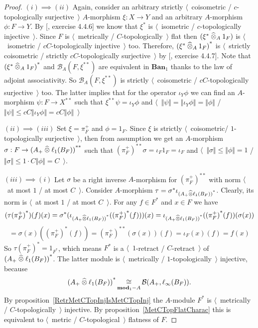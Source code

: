 \begin{proof} $(i)\implies (ii)$ Again, consider an arbitrary strictly 
$\langle$~coisometric / $c$-topologically surjective~$\rangle$ $A$-morphism
$\xi:X\to Y$ and an arbitrary $A$-morphism $\phi:F\to Y$. By
[\cite{HelLectAndExOnFuncAn}, exercise 4.4.6] we know that $\xi^*$ is
$\langle$~isometric / $c$-topologically injective~$\rangle$. Since $F$ is
$\langle$~metrically / $C$-topologically~$\rangle$ flat then
$(\xi^*\mathbin{\widehat{\otimes}}_{A}1_F)$ is $\langle$~isometric / $cC$-topologically
injective~$\rangle$ too. Therefore, ${(\xi^*\mathbin{\widehat{\otimes}}_{A}1_F)}^*$ is
$\langle$~strictly coisometric / strictly $cC$-topologically
surjective~$\rangle$ by [\cite{HelLectAndExOnFuncAn}, exercise 4.4.7]. Note that
${(\xi^*\mathbin{\widehat{\otimes}}_{A}1_F)}^*$ and $\mathcal{B}_A(F,\xi^{**})$ are equivalent
in $\mathbf{Ban}_1$ thanks to the law of adjoint associativity. So
$\mathcal{B}_A(F,\xi^{**})$ is strictly $\langle$~coisometric / 
$cC$-topologically surjective~$\rangle$ too. The latter implies that for the
operator $\iota_Y\phi$ we can find an $A$-morphism $\psi:F\to X^{**}$ such that
$\xi^{**}\psi=\iota_Y\phi$ and
$\langle$~$\Vert\psi\Vert=\Vert\iota_Y\phi\Vert=\Vert\phi\Vert$ /
$\Vert\psi\Vert\leq cC\Vert\iota_Y\phi\Vert=cC\Vert\phi\Vert$~$\rangle$

$(ii)\implies (iii)$ Set $\xi=\pi_F^+$ and $\phi=1_F$. Since $\xi$ is
strictly $\langle$~coisometric/ $1$-topologically surjective~$\rangle$,
then from assumption we get an $A$-morphism $\sigma:F\to
{(A_+\mathbin{\widehat{\otimes}}\ell_1(B_F))}^{**}$ such that 
${(\pi_F^+)}^{**}\sigma
=\iota_F 1_F
=\iota_F$ 
and $\langle$~$\Vert\sigma\Vert\leq \Vert\phi\Vert=1$ /
$\Vert\sigma\Vert\leq 1\cdot C\Vert\phi\Vert=C$~$\rangle$.

$(iii)\implies (i)$ Let $\sigma$ be a right inverse $A$-morphism for
${(\pi_F^+)}^{**}$ with norm $\langle$~at most $1$ / at most $C$~$\rangle$.
Consider $A$-morphism $\tau=\sigma^*\iota_{{(A_+\mathbin{\widehat{\otimes}}\ell_1(B_F))}^*}$.
Clearly, its norm is $\langle$~at most $1$ / at most $C$~$\rangle$. For any
$f\in F^*$ and $x\in F$ we have
$$
({\tau(\pi_F^+)}^*)(f)(x)
=\sigma^*(\iota_{{(A_+\mathbin{\widehat{\otimes}}\ell_1(B_F))}^*}({(\pi_F^+)}^*(f)))(x)
=\iota_{{(A_+\mathbin{\widehat{\otimes}}\ell_1(B_F))}^*}({(\pi_F^+)}^*(f))(\sigma(x))
$$
$$
=\sigma(x)({(\pi_F^+)}^*(f))
={(\pi_F^+)}^{**}(\sigma(x))(f)
=\iota_F(x)(f)
=f(x)
$$
So ${\tau(\pi_F^+)}^*=1_{F^*}$, which means $F^*$ is a 
$\langle$~$1$-retract / $C$-retract~$\rangle$ of
${(A_+\mathbin{\widehat{\otimes}}\ell_1(B_F))}^*$. The latter module is $\langle$~metrically /
$1$-topologically~$\rangle$ injective, because 
$$
{(A_+\mathbin{\widehat{\otimes}}\ell_1(B_F))}^*
\mathop{\mathbin{\cong}}\limits_{\mathbf{mod}_1-A}
\mathcal{B}(A_+,\ell_\infty(B_F)).
$$ 
By proposition~\ref{RetrMetCTopInjIsMetCTopInj} the $A$-module $F^*$ is
$\langle$~metrically / $C$-topologically~$\rangle$ injective. By 
proposition~\ref{MetCTopFlatCharac} this is
equivalent to $\langle$~metric / $C$-topological~$\rangle$ flatness of $F$.
\end{proof}

